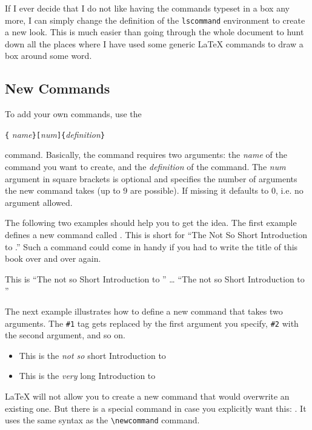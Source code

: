 If I ever decide that I do not like having the commands typeset in
a box any more, I can simply change the definition of the
\texttt{lscommand} environment to create a new look. This is much
easier than going through the whole document to hunt down all the
places where I have used some generic \LaTeX{} commands to draw a
box around some word.


\subsection{New Commands}

To add your own commands, use the
\begin{lscommand}
\verb|{|%
       \emph{name}\verb|}[|\emph{num}\verb|]{|\emph{definition}\verb|}|
\end{lscommand}
\noindent command.
Basically, the command requires two arguments: the \emph{name} of the
command you want to create, and the \emph{definition} of the command.
The \emph{num} argument in square brackets is optional and specifies the number
of arguments the new command takes (up to 9 are possible).
If missing it defaults to 0, i.e. no argument allowed.

The following two examples should help you to get the idea.
The first example defines a new command called . This is
short for ``The Not So Short Introduction to \LaTeXe.'' Such a command
could come in handy if you had to write the title of this book over
and over again.

\begin{example}
\newcommand{\tnss}{The not
    so Short Introduction to
    \LaTeXe}
This is ``\tnss'' \ldots{}
``\tnss''
\end{example}

The next example illustrates how to define a new
command that takes two arguments.
The \verb|#1| tag gets replaced by the first argument you specify,
\verb|#2| with the second argument, and so on.

\begin{example}
\newcommand{\txsit}[2]
 {This is the \emph{#1}
  #2 Introduction to \LaTeXe}
\begin{itemize}
\item \txsit{not so}{short}
\item \txsit{very}{long}
\end{itemize}
\end{example}

\LaTeX{} will not allow you to create a new command that would
overwrite an existing one. But there is a special command in case you
explicitly want this: .
It uses the same syntax as the \verb|\newcommand|
command.

